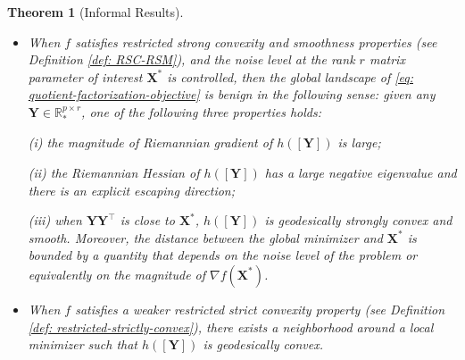 \documentclass[11pt]{article}
\newtheorem{Theorem}{Theorem}
\newcommand{\bbR}{\mathbb{R}}
\newcommand{\0}{{\mathbf{0}}}
\newcommand{\1}{{\mathbf{1}}}
\newcommand{\X}{{\mathbf{X}}}
\newcommand{\Y}{{\mathbf{Y}}}
\begin{document}
\begin{Theorem}[Informal Results] \label{th: informal-statement-main-result}
	\begin{itemize}
		\item[(a)] When $f$ satisfies restricted strong convexity and smoothness properties (see Definition \ref{def: RSC-RSM}), and the noise level at the rank $r$ matrix parameter of interest $\X^*$ is controlled, then the global landscape of \eqref{eq: quotient-factorization-objective} is benign in the following sense: given any $\Y \in \bbR^{p \times r}_*$, one of the following three properties holds: 
		
		(i) the magnitude of Riemannian gradient of $h([\Y])$ is large; 
		
		(ii) the Riemannian Hessian of $h([\Y])$ has a large negative eigenvalue and there is an explicit escaping direction; 
		
		(iii) when $\Y\Y^\top$ is close to $\X^*$, $h([\Y])$ is geodesically strongly convex and smooth. Moreover, the distance between the global minimizer and $\X^*$ is bounded by a quantity that depends on the noise level of the problem or equivalently on the magnitude of $\nabla f(\X^*)$.  
		\item[(b)] When $f$ satisfies a weaker restricted strict convexity property (see Definition \ref{def: restricted-strictly-convex}), there exists a neighborhood around a local minimizer such that $h([\Y])$ is geodesically convex.
	\end{itemize}
\end{Theorem}
\end{document}
